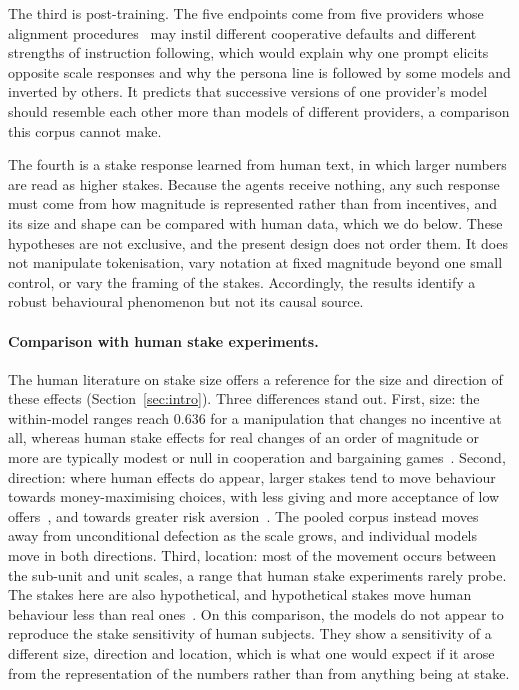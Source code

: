 \documentclass[11pt,a4paper]{article}
\newcommand{\rev}[1]{{\color{red}#1}}
\newcommand{\rev}[1]{#1}
\begin{document}
{The third is post-training. The five endpoints come from five providers whose
alignment procedures~\cite{ouyang2022training} may instil different cooperative
defaults and different strengths of instruction following, which would explain
why one prompt elicits opposite scale responses and why the persona line is
followed by some models and inverted by others. It predicts that successive
versions of one provider's model should resemble each other more than models
of different providers, a comparison this corpus cannot make.

The fourth is a stake response learned from human text, in which larger
numbers are read as higher stakes. Because the agents receive nothing, any
such response must come from how magnitude is represented rather than from
incentives, and its size and shape can be compared with human data, which we
do below. These hypotheses are not exclusive, and the present design does not
order them. It does not manipulate tokenisation, vary notation at fixed
magnitude beyond one small control, or vary the framing of the stakes.
Accordingly, the results identify a robust behavioural phenomenon but not its
causal source.}

\rev{\paragraph{Comparison with human stake experiments.} The human
literature on stake size offers a reference for the size and direction of
these effects (Section~\ref{sec:intro}). Three differences stand out. First,
size: the within-model ranges reach 0.636 for a manipulation that changes no
incentive at all, whereas human stake effects for real changes of an order of
magnitude or more are typically modest or null in cooperation and bargaining
games~\cite{kocher2008does,larney2019stake,engel2011dictator}. Second,
direction: where human effects do appear, larger stakes tend to move
behaviour towards money-maximising choices, with less giving and more
acceptance of low offers~\cite{engel2011dictator,andersen2011stakes}, and
towards greater risk aversion~\cite{holt2002risk}. The pooled corpus instead
moves away from unconditional defection as the scale grows, and individual
models move in both directions. Third, location: most of the movement occurs
between the sub-unit and unit scales, a range that human stake experiments
rarely probe. The stakes here are also hypothetical, and hypothetical stakes
move human behaviour less than real ones~\cite{camerer1999effects}. On this
comparison, the models do not appear to reproduce the stake sensitivity of
human subjects. They show a sensitivity of a different size, direction and
location, which is what one would expect if it arose from the representation
of the numbers rather than from anything being at stake.}
\end{document}
